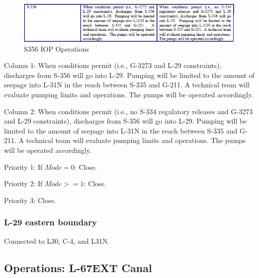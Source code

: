 \begin{figure}[!h]
  \begin{center}
  \includegraphics[width=6.5in]{../figs/S356_IOPops.png}
  \caption{S356 IOP Operations}
  \label{fig:S356iop}
  \end{center}
\end{figure}

Column 1:
When conditions permit (i.e., G-3273 and L-29 constraints), discharges from S-356 will go into L-29. Pumping will be limited to the amount of seepage into L-31N in the reach between S-335 and G-211. A technical team will evaluate pumping limits and operations. The pumps will be operated accordingly.

Column 2:
When conditions permit (i.e., no S-334 regulatory releases and G-3273 and L-29 constraints), discharges from S-356 will go into L-29. Pumping will be limited to the amount of seepage into L-31N in the reach between S-335 and G-211. A technical team will evaluate pumping limits and operations. The pumps will be operated accordingly.


\begin{packed_items}
\item Priority 1: If $Mode=0$: Close.
\item Priority 2: If $Mode>=1$: Close.
\item Priority 3: Close.
\end{packed_items}


\clearpage
\subsubsection{L-29 eastern boundary}
Connected to L30, C-4, and L31N.

\clearpage
\subsection{Operations: L-67EXT Canal}
